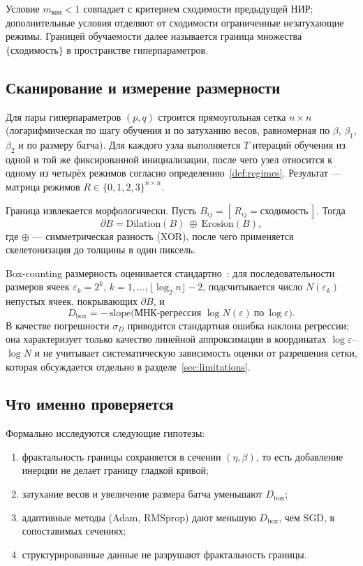 Условие $m_{\text{кон}}<1$ совпадает с критерием сходимости предыдущей НИР;
дополнительные условия отделяют от сходимости ограниченные незатухающие режимы.
Границей обучаемости далее называется граница множества
$\{\text{сходимость}\}$ в пространстве гиперпараметров.

\subsection{Сканирование и измерение размерности}

Для пары гиперпараметров $(p,q)$ строится прямоугольная сетка $n\times n$
(логарифмическая по шагу обучения и по затуханию весов, равномерная по
$\beta$, $\beta_1$, $\beta_2$ и по размеру батча). Для каждого узла выполняется
$T$ итераций обучения из одной и той же фиксированной инициализации, после чего
узел относится к одному из четырёх режимов согласно
определению~\ref{def:regimes}. Результат --- матрица режимов $R\in\{0,1,2,3\}^{n\times n}$.

Граница извлекается морфологически. Пусть $B_{ij}=[\,R_{ij}=\text{сходимость}\,]$.
Тогда
\begin{equation}
  \partial B = \mathrm{Dilation}(B)\ \oplus\ \mathrm{Erosion}(B),
\end{equation}
где $\oplus$ --- симметрическая разность (XOR), после чего применяется
скелетонизация до толщины в один пиксель.

Box-counting размерность оценивается стандартно~\cite{falconer2014}: для
последовательности размеров ячеек $\varepsilon_k = 2^k$, $k=1,\dots,\lfloor\log_2 n\rfloor-2$,
подсчитывается число $N(\varepsilon_k)$ непустых ячеек, покрывающих $\partial B$, и
\begin{equation}\label{eq:box}
  D_{\mathrm{box}} = -\,\mathrm{slope}\bigl(\text{МНК-регрессия } \log N(\varepsilon)\ \text{по}\ \log\varepsilon\bigr).
\end{equation}
В качестве погрешности $\sigma_D$ приводится стандартная ошибка наклона
регрессии; она характеризует только качество линейной аппроксимации в
координатах $\log\varepsilon$--$\log N$ и не учитывает систематическую
зависимость оценки от разрешения сетки, которая обсуждается отдельно
в разделе~\ref{sec:limitations}.

\subsection{Что именно проверяется}

Формально исследуются следующие гипотезы:
\begin{enumerate}[leftmargin=*,topsep=2pt,itemsep=1pt]
  \item фрактальность границы сохраняется в сечении $(\eta,\beta)$, то есть
        добавление инерции не делает границу гладкой кривой;
  \item затухание весов и увеличение размера батча уменьшают $D_{\mathrm{box}}$;
  \item адаптивные методы (Adam, RMSprop) дают меньшую $D_{\mathrm{box}}$, чем SGD,
        в сопоставимых сечениях;
  \item структурированные данные не разрушают фрактальность границы.
\end{enumerate}
